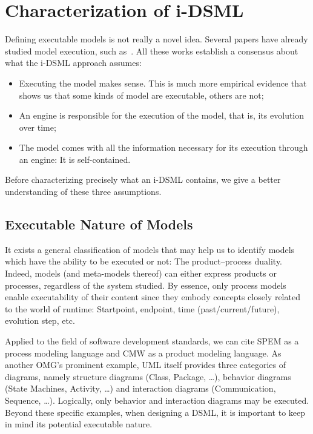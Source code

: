 \documentclass[english, 10pt]{llncs}
\begin{document}
\section{Characterization of i-DSML}
\label{iDSML-charaterization}

Defining executable models is not really a novel idea. Several papers
have already studied model execution, such
as~\cite{breton01,cariou-ecmfa11,clarke-book-iDSML13,combemale-jos09,combemale-apsec12,engels00,lehmann10,pons00}. All
these works establish a consensus about what the i-DSML approach
assumes:
\begin{itemize}
\item Executing the model makes sense. This is much more empirical
  evidence that shows us that some kinds of model are executable,
  others are not;
\item An engine is responsible for the execution of the model, that
  is, its evolution over time;
\item The model comes with all the information necessary for its
  execution through an engine: It is self-contained.
\end{itemize}

Before characterizing precisely what an i-DSML contains, we give a
better understanding of these three assumptions.

\subsection{Executable Nature of Models}

It exists a general classification of models that may help us to
identify models which have the ability to be executed or not: The
product--process duality. Indeed, models (and meta-models thereof) can
either express products or processes, regardless of the system
studied. By essence, only process models enable executability of their
content since they embody concepts closely related to the world of
runtime: Startpoint, endpoint, time (past/current/future), evolution
step, etc.
 
Applied to the field of software development standards, we can cite
SPEM as a process modeling language and CMW as a product modeling
language. As another OMG's prominent example, UML itself provides
three categories of diagrams, namely structure diagrams (Class,
Package, \dots), behavior diagrams (State Machines, Activity, \dots)
and interaction diagrams (Communication, Sequence, \dots). Logically,
only behavior and interaction diagrams may be executed. Beyond these
specific examples, when designing a DSML, it is important to keep in
mind its potential executable nature.
\end{document}
